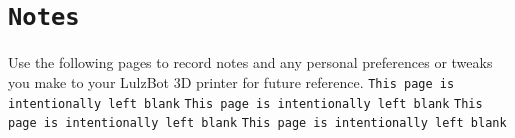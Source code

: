 %
%
%
%
%


\section{\texttt{Notes}}
Use the following pages to record notes and any personal preferences or tweaks you make to your LulzBot 3D printer for future reference.
\thispagestyle{empty}
\begingroup
\newpage
\mbox{}
\null
\vfill
\thispagestyle{empty}
\texttt{This page is intentionally left blank}
\newpage
\mbox{}
\null
\vfill
\thispagestyle{empty}
\texttt{This page is intentionally left blank}
\newpage
\mbox{}
\null
\vfill
\thispagestyle{empty}
\texttt{This page is intentionally left blank}
\newpage
\mbox{}
\null
\vfill
\thispagestyle{empty}
\texttt{This page is intentionally left blank}
\endgroup
